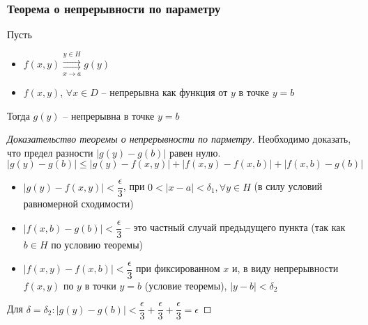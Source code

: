\subsubsection{Теорема о непрерывности по параметру}
\begin{theorem*}
    Пусть
    \begin{itemize}
        \item $f(x, y) \overset{y \in H}{\underset{x \to a}{\rightrightarrows}} g(y)$
        \item $f(x, y)$, $\forall x \in D$ -- непрерывна как функция от $y$ в точке $y = b$
    \end{itemize}
    Тогда $g(y)$ -- непрерывна в точке $y = b$
\end{theorem*}
\begin{proof}[Доказательство теоремы о непрерывности по парметру]
    Необходимо доказать, что предел разности $|g(y) - g(b)|$ равен нулю. \\ 
    $|g(y) - g(b)| \leqslant |g(y) - f(x, y)| + |f(x, y) - f(x, b)| + |f(x, b) - g(b)|$
    \begin{itemize}
        \item $|g(y) - f(x, y)| < \dfrac{\epsilon}{3}$, при $0 < |x - a| < \delta_1, \forall y \in H$ 
        (в силу условий равномерной сходимости)
        \item $|f(x, b) - g(b)| < \dfrac{\epsilon}{3}$ -- это частный случай предыдущего 
        пункта (так как $b \in H$ по условию теоремы)
        \item $|f(x, y) - f(x, b)| < \dfrac{\epsilon}{3}$ при фиксированном $x$ и, в виду непрерывности
        $f(x, y)$ по $y$ в точки $y = b$ (условие теоремы), $|y - b| < \delta_2$
    \end{itemize}
    Для $\delta = \delta_2: |g(y) - g(b)| < \dfrac{\epsilon}{3} + 
    \dfrac{\epsilon}{3} +  \dfrac{\epsilon}{3} = \epsilon$
\end{proof}

